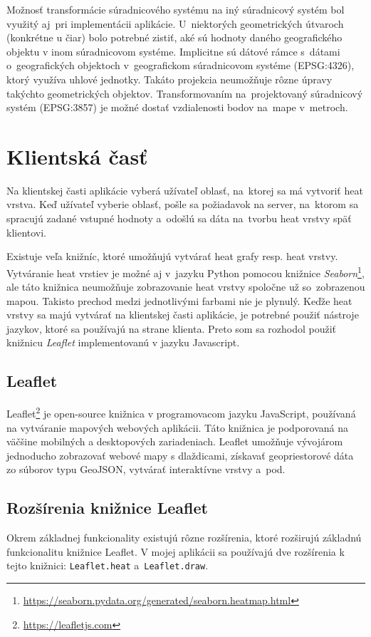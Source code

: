 Možnosť transformácie súradnicového systému na iný súradnicový systém bol využitý aj~pri implementácii aplikácie. U~niektorých geometrických útvaroch (konkrétne u čiar) bolo potrebné zistiť, aké sú hodnoty daného geografického objektu v inom súradnicovom systéme. Implicitne sú dátové rámce s~dátami o~geografických objektoch v~geografickom súradnicovom systéme (EPSG:4326), ktorý využíva uhlové jednotky. Takáto projekcia neumožňuje rôzne úpravy takýchto geometrických objektov. Transformovaním na~projektovaný súradnicový systém (EPSG:3857) je možné dostať vzdialenosti bodov na~mape v~metroch.


\section{Klientská časť}
Na klientskej časti aplikácie vyberá užívateľ oblasť, na~ktorej sa má vytvoriť heat vrstva. Keď užívateľ vyberie oblasť, pošle sa požiadavok na server, na~ktorom sa spracujú zadané vstupné hodnoty a~odošlú sa dáta na~tvorbu heat vrstvy späť klientovi.

Existuje veľa knižníc, ktoré umožňujú vytvárať heat grafy resp. heat vrstvy. Vytváranie heat vrstiev je možné aj v~jazyku Python pomocou knižnice \emph{Seaborn}\footnote{\url{https://seaborn.pydata.org/generated/seaborn.heatmap.html}}, ale táto knižnica neumožňuje zobrazovanie heat vrstvy spoločne už so~zobrazenou mapou. Takisto prechod medzi jednotlivými farbami nie je plynulý. Keďže heat vrstvy sa majú vytvárať na klientskej časti aplikácie, je potrebné použiť nástroje jazykov, ktoré sa používajú na strane klienta. Preto som sa rozhodol použiť knižnicu \emph{Leaflet} implementovanú v jazyku Javascript.

\subsection{Leaflet}
Leaflet\footnote{\url{https://leafletjs.com}} je open-source knižnica v programovacom jazyku JavaScript, používaná na vytváranie mapových webových aplikácii. Táto knižnica je podporovaná na väčšine mobilných a desktopových zariadeniach. Leaflet umožňuje vývojárom jednoducho zobrazovať webové mapy s dlaždicami, získavať geopriestorové dáta zo súborov typu GeoJSON, vytvárať interaktívne vrstvy a~pod.

\subsection{Rozšírenia knižnice Leaflet}
Okrem základnej funkcionality existujú rôzne rozšírenia, ktoré rozširujú základnú funkcionalitu knižnice Leaflet. V mojej aplikácii sa používajú dve rozšírenia k tejto knižnici: \texttt{Leaflet.heat} a~\texttt{Leaflet.draw}. 

